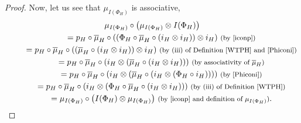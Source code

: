\documentclass[10pt,a4paper]{amsart}
\numberwithin{equation}{section}
\begin{document}
\begin{proof}
Now, let us see that $\mu_{I(\Phi_{H})}$ is associative,
\begin{gather*}
\mu_{I(\Phi_{H})}\circ\bigl(\mu_{I(\Phi_{H})}\otimes I(\Phi_{H})\bigr)\\
\qquad{}= p_{H}\circ\overline{\mu}_{H}\circ((\Phi_{H}\circ\overline{\mu}_{H}\circ(i_{H}\otimes i_{H}))\otimes i_{H})\ \text{\footnotesize\textnormal{(by \eqref{iconp})}}\\
\qquad{}= p_{H}\circ\overline{\mu}_{H}\circ((\overline{\mu}_{H}\circ(i_{H}\otimes i_{H}))\otimes i_{H})\ \text{\footnotesize\textnormal{(by (iii) of Definition \ref{WTPH} and \eqref{Phiconi})}}\\
\qquad{}= p_{H}\circ\overline{\mu}_{H}\circ(i_{H}\otimes(\overline{\mu}_{H}\circ(i_{H}\otimes i_{H})))\ \text{\footnotesize\textnormal{(by associativity of $\overline{\mu}_{H}$)}}\\
\qquad{}= p_{H}\circ\overline{\mu}_{H}\circ(i_{H}\otimes(\overline{\mu}_{H}\circ(i_{H}\otimes (\Phi_{H}\circ i_{H}))))\ \text{\footnotesize\textnormal{(by \eqref{Phiconi})}}\\
\qquad{}= p_{H}\circ\overline{\mu}_{H}\circ(i_{H}\otimes(\Phi_{H}\circ \overline{\mu}_{H}\circ(i_{H}\otimes i_{H})))\ \text{\footnotesize\textnormal{(by (iii) of Definition \ref{WTPH})}}\\
\qquad{}= \mu_{I(\Phi_{H})}\circ\bigl(I(\Phi_{H})\otimes\mu_{I(\Phi_{H})}\bigr)\ \text{\footnotesize\textnormal{(by \eqref{iconp} and definition of $\mu_{I(\Phi_{H})}$)}}.
\end{gather*}


\end{proof}
\end{document}
